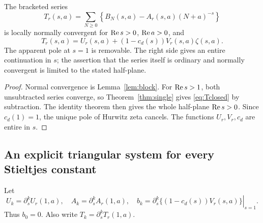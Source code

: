 \begin{theorem}\label{thm:subtraction}
The bracketed series
\begin{equation}\label{eq:T}
 T_r(s,a)=\sum_{N\ge0}\left\{B_N(s,a)-A_r(s,a)(N+a)^{-s}\right\}
\end{equation}
is locally normally convergent for $\operatorname{Re} s>0$, $\operatorname{Re} a>0$, and
\begin{equation}\label{eq:Tclosed}
 \boxed{\displaystyle
 T_r(s,a)=U_r(s,a)+(1-c_d(s))V_r(s,a)\zeta(s,a).}
\end{equation}
The apparent pole at $s=1$ is removable. The right side gives an entire
continuation in $s$; the assertion that the series itself is ordinary
and normally convergent is limited to the stated half-plane.
\end{theorem}
\begin{proof}
Normal convergence is Lemma~\ref{lem:block}. For $\operatorname{Re} s>1$, both
unsubtracted series converge, so Theorem~\ref{thm:single} gives
\eqref{eq:Tclosed} by subtraction. The identity theorem then gives the
whole half-plane $\operatorname{Re} s>0$. Since $c_d(1)=1$, the unique pole of
Hurwitz zeta cancels. The functions $U_r,V_r,c_d$ are entire in $s$.
\end{proof}

\subsection{An explicit triangular system for every Stieltjes constant}
Let
\begin{equation}\label{eq:jetdefs}
 U_k=\partial_s^kU_r(1,a),\quad
 A_k=\partial_s^kA_r(1,a),\quad
 b_k=\left.\partial_s^k\{(1-c_d(s))V_r(s,a)\}\right|_{s=1}.
\end{equation}
Thus $b_0=0$. Also write $T_k=\partial_s^kT_r(1,a)$.

